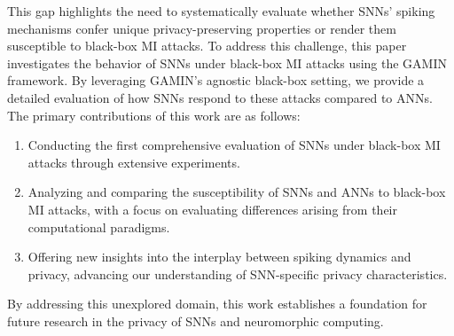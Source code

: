 This gap highlights the need to systematically evaluate whether SNNs' spiking mechanisms confer unique privacy-preserving properties or render them susceptible to black-box MI attacks. To address this challenge, this paper investigates the behavior of SNNs under black-box MI attacks using the GAMIN framework. By leveraging GAMIN’s agnostic black-box setting, we provide a detailed evaluation of how SNNs respond to these attacks compared to ANNs. The primary contributions of this work are as follows:
\begin{enumerate}
    \item Conducting the first comprehensive evaluation of SNNs under black-box MI attacks through extensive experiments.
    \item Analyzing and comparing the susceptibility of SNNs and ANNs to black-box MI attacks, with a focus on evaluating differences arising from their computational paradigms.
    \item Offering new insights into the interplay between spiking dynamics and privacy, advancing our understanding of SNN-specific privacy characteristics.
\end{enumerate}

By addressing this unexplored domain, this work establishes a foundation for future research in the privacy of SNNs and neuromorphic computing.



